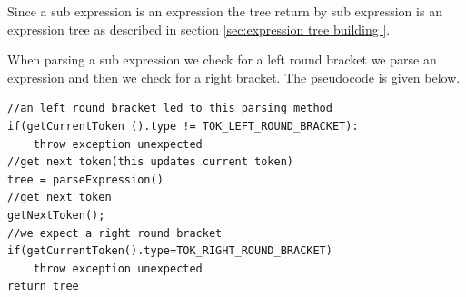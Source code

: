 Since a sub expression is an expression the tree return by sub expression is an expression tree as described in section \ref{sec:expression tree building }.


When parsing a sub expression we check for a left round bracket we parse an expression and then we check for a right bracket. The pseudocode is given below.
\begin{lstlisting}[caption=PSEUDOCODE for (\emph{parseSubExpression()})]
//an left round bracket led to this parsing method 
if(getCurrentToken ().type != TOK_LEFT_ROUND_BRACKET):
    throw exception unexpected
//get next token(this updates current token)
tree = parseExpression()
//get next token 
getNextToken();
//we expect a right round bracket
if(getCurrentToken().type=TOK_RIGHT_ROUND_BRACKET)
    throw exception unexpected
return tree
\end{lstlisting}

